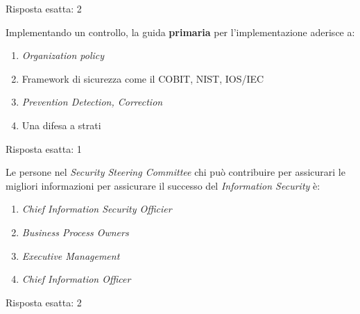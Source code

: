 \begin{Answer} [
  ref={esSA5},
  number={5}
  ]

  \Question Risposta esatta: 2
\end{Answer}


\begin{Exercise} [
  title={Quiz},
  label={esSA6}
  ]

  \Question Implementando un controllo, la guida \textbf{primaria} per 
l'implementazione aderisce a:
\begin{enumerate}
 \item \textit{Organization policy}
 \item Framework di sicurezza come il COBIT, NIST, IOS/IEC
 \item \textit{Prevention Detection, Correction}
 \item Una difesa a strati
\end{enumerate}
  
\end{Exercise}

\begin{Answer} [
  ref={esSA6},
  number={6}
  ]

  \Question Risposta esatta: 1
\end{Answer}


\begin{Exercise} [
  title={Quiz},
  label={esSA7}
  ]

  \Question Le persone nel \textit{Security Steering Committee} chi può 
contribuire per assicurari le migliori informazioni per assicurare il successo 
del \textit{Information Security} è:
\begin{enumerate}
 \item \textit{Chief Information Security Officier}
 \item \textit{Business Process Owners}
 \item \textit{Executive Management}
 \item \textit{Chief Information Officer}
\end{enumerate}
  
\end{Exercise}

\begin{Answer} [
  ref={esSA7},
  number={7}
  ]

  \Question Risposta esatta: 2
\end{Answer}
